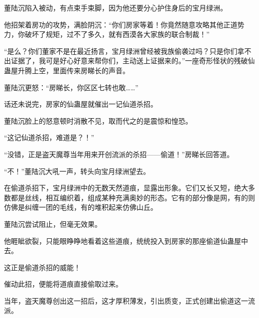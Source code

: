 \begin{this_body}
董陆沉陷入被动，有点束手束脚，因为他还要分心护住身后的宝月绿洲。

他招架着房功的攻势，满脸阴沉：“你们房家等着！你竟然随意攻略其他正道势力，你破坏了规矩，过不了多久，就有西漠各大家族的联合制裁！”

“是么？你们董家不是在最近扬言，宝月绿洲曾经被我族偷袭过吗？只是你们拿不出证据了，我可是好心好意来帮你们，主动送上证据来的。”一座奇形怪状的残破仙蛊屋升腾上空，里面传来房睇长的声音。

董陆沉更怒：“房睇长，你区区七转也敢……”

话还未说完，房家的仙蛊屋就催出一记仙道杀招。

董陆沉脸上的怒意顿时消散不见，取而代之的是震惊和惶恐。

“这记仙道杀招，难道是？！”

“没错，正是盗天魔尊当年用来开创流派的杀招——偷道！”房睇长回答道。

“不！”董陆沉大吼一声，转头向宝月绿洲望去。

在偷道杀招下，宝月绿洲中的无数天然道痕，显露出形象。它们又长又短，绝大多数都是丝线，相互编织着，组成某种充满奥妙的形态。它有的部分像是网，有的则仿佛是纠缠一团的毛线，有的堆积起来仿佛山丘。

董陆沉尝试阻止，但毫无效果。

他睚眦欲裂，只能眼睁睁地看着这些道痕，统统投入到房家的那座偷道仙蛊屋中去。

这正是偷道杀招的威能！

催动此招，便能将道痕直接偷取过来。

当年，盗天魔尊创出这一招后，这才厚积薄发，引出质变，正式创建出偷道这一流派。

\end{this_body}

